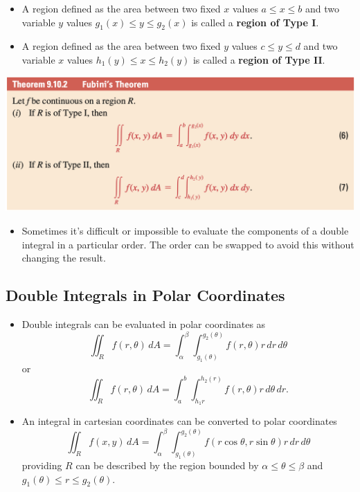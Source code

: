 \documentclass{article}
\begin{document}
\begin{itemize}
  \item A region defined as the area between two fixed $x$ values $a \le x \le b$ and two variable $y$ values $g_1(x) \le y \le g_2(x)$ is called a \textbf{region of Type I}.

  \item A region defined as the area between two fixed $y$ values $c \le y \le d$ and two variable $x$ values $h_1(y) \le x \le h_2(y)$ is called a \textbf{region of Type II}.
\end{itemize}

\includegraphics[scale=0.443]{evaluation-of-double-integrals}

\begin{itemize}
  \item Sometimes it's difficult or impossible to evaluate the components of a double integral in a particular order. The order can be swapped to avoid this without changing the result.
\end{itemize}

\subsection{Double Integrals in Polar Coordinates}

\begin{itemize}
  \item Double integrals can be evaluated in polar coordinates as \[\iint_R f(r, \theta) \,dA = \int_\alpha^\beta \int_{g_1(\theta)}^{g_2(\theta)} f(r, \theta) r \,dr \,d \theta\] or \[\iint_R f(r, \theta) \,dA = \int_a^b \int_{h_1{r}}^{h_2(r)} f(r, \theta) r \,d \theta \,dr.\]

  \item An integral in cartesian coordinates can be converted to polar coordinates \[\iint_R f(x, y) \,dA = \int_\alpha^\beta \int_{g_1(\theta)}^{g_2(\theta)} f(r \cos \theta, r \sin \theta) r \,dr \,d \theta\] providing $R$ can be described by the region bounded by $\alpha \le \theta \le \beta$ and $g_1(\theta) \le r \le g_2(\theta)$.
\end{itemize}
\end{document}
